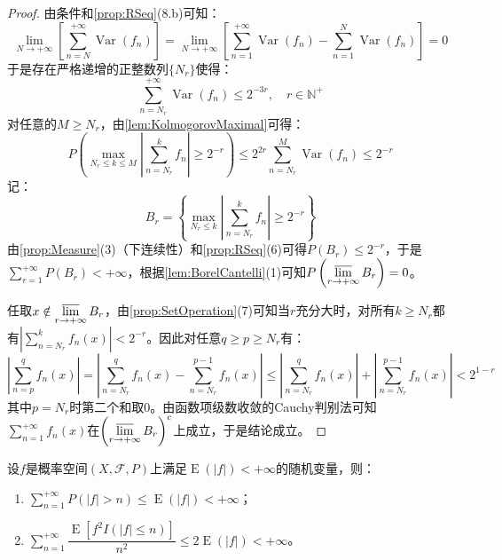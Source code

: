 \begin{proof}
	由条件和\cref{prop:RSeq}(8.b)可知：
	\begin{equation*}
		\lim_{N\to+\infty}\left[\sum_{n=N}^{+\infty}\operatorname{Var}(f_n)\right]=\lim_{N\to+\infty}\left[\sum_{n=1}^{+\infty}\operatorname{Var}(f_n)-\sum_{n=1}^{N}\operatorname{Var}(f_n)\right]=0
	\end{equation*}
	于是存在严格递增的正整数列$\{N_r\}$使得：
	\begin{equation*}
		\sum_{n=N_r}^{+\infty}\operatorname{Var}(f_n)\leqslant2^{-3r},\quad r\in\mathbb{N}^+
	\end{equation*}
	对任意的$M\geqslant N_r$，由\cref{lem:KolmogorovMaximal}可得：
	\begin{equation*}
		P\left(\max_{N_r\leqslant k\leqslant M}\left|\sum_{n=N_r}^{k}f_n\right|\geqslant2^{-r}\right)\leqslant2^{2r}\sum_{n=N_r}^{M}\operatorname{Var}(f_n)\leqslant2^{-r}
	\end{equation*}
	记：
	\begin{equation*}
		B_r=\left\{\max_{N_r\leqslant k}\left|\sum_{n=N_r}^{k}f_n\right|\geqslant2^{-r}\right\}
	\end{equation*}
	由\cref{prop:Measure}(3)（下连续性）和\cref{prop:RSeq}(6)可得$P(B_r)\leqslant2^{-r}$，于是$\sum\limits_{r=1}^{+\infty}P(B_r)<+\infty$，根据\cref{lem:BorelCantelli}(1)可知$P\left(\varlimsup\limits_{r\to+\infty}B_r\right)=0$。\par
	任取$x\notin\varlimsup\limits_{r\to+\infty}B_r$，由\cref{prop:SetOperation}(7)可知当$r$充分大时，对所有$k\geqslant N_r$都有$\left|\sum\limits_{n=N_r}^{k}f_n(x)\right|<2^{-r}$。因此对任意$q\geqslant p\geqslant N_r$有：
	\begin{equation*}
		\left|\sum_{n=p}^{q}f_n(x)\right|=\left|\sum_{n=N_r}^{q}f_n(x)-\sum_{n=N_r}^{p-1}f_n(x)\right|\leqslant\left|\sum_{n=N_r}^{q}f_n(x)\right|+\left|\sum_{n=N_r}^{p-1}f_n(x)\right|<2^{1-r}
	\end{equation*}
	其中$p=N_r$时第二个和取$0$。由函数项级数收敛的Cauchy判别法可知$\sum\limits_{n=1}^{+\infty}f_n(x)$在$\left(\varlimsup\limits_{r\to+\infty}B_r\right)^c$上成立，于是结论成立。
\end{proof}
\begin{lemma}\label{lem:IntegrableTruncation}
	设$f$是概率空间$(X,\mathscr{F},P)$上满足$\operatorname{E}(|f|)<+\infty$的随机变量，则：
	\begin{enumerate}
		\item $\sum\limits_{n=1}^{+\infty}P(|f|>n)\leqslant\operatorname{E}(|f|)<+\infty$；
		\item $\sum\limits_{n=1}^{+\infty}\dfrac{\operatorname{E}[f^2I(|f|\leqslant n)]}{n^2}\leqslant2\operatorname{E}(|f|)<+\infty$。
	\end{enumerate}
\end{lemma}
